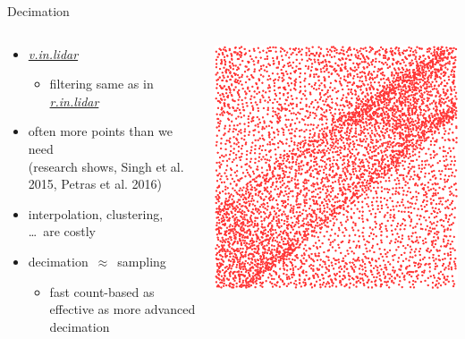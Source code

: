 \documentclass[xcolor={dvipsnames,usenames},beamer,aspectratio=43]{beamer}
\newcommand{\gmodule}[1]{\href{http://grass.osgeo.org/grass71/manuals/#1.html}{\emph{#1}}}
\begin{document}
\begin{frame}{Decimation}

\begin{columns}
\begin{column}{0.58\textwidth}

\begin{itemize}
  \item \gmodule{v.in.lidar}
  \begin{itemize}
  \item filtering same as in \gmodule{r.in.lidar}
  \end{itemize}
  \item often more points than we need {\small\\ (research shows, Singh et al. 2015, Petras et al. 2016)}
  \item interpolation, clustering, \ldots\ are costly
  \item decimation~$\approx$~sampling
  \begin{itemize}
    \item fast count-based as effective as more advanced decimation
  \end{itemize}
\end{itemize}

\end{column}
\begin{column}{0.22\textwidth}


\begin{center}
\includegraphics[width=\textwidth]{features/full}


\end{center}
\end{column}
\end{columns}
\end{frame}
\end{document}

